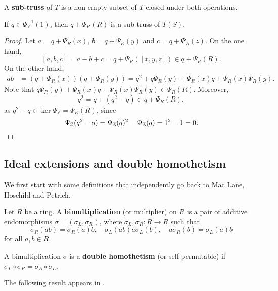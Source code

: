 \documentclass{svmult}
\newcommand{\Z}{\mathbb{Z}}
\begin{document}
A \textbf{sub-truss} of $T$ is a non-empty subset of $T$ closed under both operations. 

\begin{proposition}
    If $q\in\Psi_{\Z}^{-1}(1)$, then 
    $q+\Psi_R(R)$ is a sub-truss of $T(S)$. 
\end{proposition}

\begin{proof}
    Let $a=q+\Psi_R(x)$, $b=q+\Psi_R(y)$ and $c=q+\Psi_R(z)$. On the one hand,
    \[
    [a,b,c]=a-b+c=q+\Psi_R([x,y,z])\in q+\Psi_R(R).
    \]
    On the other hand, 
    \begin{align*}
        ab &= (q+\Psi_R(x))(q+\Psi_R(y)) 
        = q^2+q\Psi_R(y)+\Psi_R(x)q+\Psi_R(x)\Psi_R(y).
    \end{align*}
    Note that $q\Psi_R(y)+\Psi_R(x)q+\Psi_R(x)\Psi_R(y)\in\Psi_R(R)$. Moreover, 
    \[
    q^2=q+(q^2-q)\in q+\Psi_R(R),
    \]
    as $q^2-q\in\ker\Psi_{\Z}=\Psi_R(R)$, since 
    \[
    \Psi_{\Z}(q^2-q)=\Psi_{\Z}(q)^2-\Psi_{\Z}(q)=1^2-1=0.\qedhere 
    \]
\end{proof}

\subsection{Ideal extensions and double homothetism}

We first start with some definitions that independently 
go back to Mac Lane, Hoschild
and Petrich. 

\begin{definition}
Let $R$ be a ring. A \textbf{bimultiplication} (or multiplier) on $R$ is a pair of additive
endomorphisms $\sigma=(\sigma_L,\sigma_R)$, where 
$\sigma_L,\sigma_R\colon R\to R$ such that
\[
\sigma_R(ab)=\sigma_R(a)b,\quad
\sigma_L(ab)a\sigma_L(b),\quad
a\sigma_R(b)=\sigma_L(a)b
\]
for all $a,b\in R$. 
\end{definition}

\begin{definition}
    A bimultiplication $\sigma$ is a \textbf{double homothetism} (or self-permutable)
    if $\sigma_L\circ \sigma_R=\sigma_R\circ \sigma_L$.
\end{definition}

The following result appears in \cite{MR4396016}. 
\end{document}
